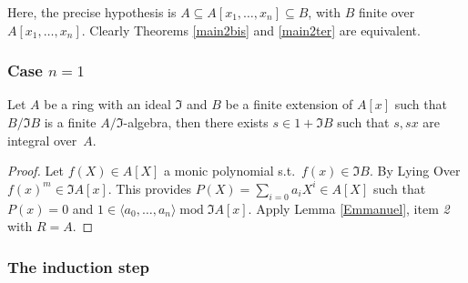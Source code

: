 \documentclass[11pt,a4paper,twoside]{article}
\newcommand{\gothic}{\mathfrak}
\newcommand{\fI}{{\gothic I}}
\newcommand\gen[1]{{\langle #1 \rangle}}
\newcommand{\mod}{\;\mathrm{mod}\;}
\begin{document}
  
Here, the precise hypothesis is $A\subseteq A[x_1,\dots,x_n]\subseteq B$,
with $B$ finite over $A[x_1,\dots,x_n]$.  
Clearly
Theorems \ref{main2bis} and \ref{main2ter} are equivalent.

\subsubsection*{Case $n=1$}

\begin{proposition}\label{3.1}
Let $A$ be a ring with an ideal $\fI$
and $B$ be a finite extension of $A[x]$ such that $B/\fI B$ is a finite $A/\fI$-algebra,  then there exists $s\in 1+\fI B$ such that
$s,sx$ are integral over~$A$.
\end{proposition}
%
\begin{proof}
Let $f(X)\in A[X]$ a monic polynomial s.t.\ $f(x)\in\fI B$.
By Lying Over $f(x)^m\in\fI A[x]$. This provides $P(X)=\sum_{i=0}a_iX^{i}\in A[X]$
such that $P(x)=0$ and $1\in \gen{a_0,\dots,a_n}\mod {\fI}A[x]$.
 Apply Lemma \ref{Emmanuel}, item \emph{2} with $R=A$. 
\end{proof}
%



\subsubsection*{The induction step}
\end{document}
